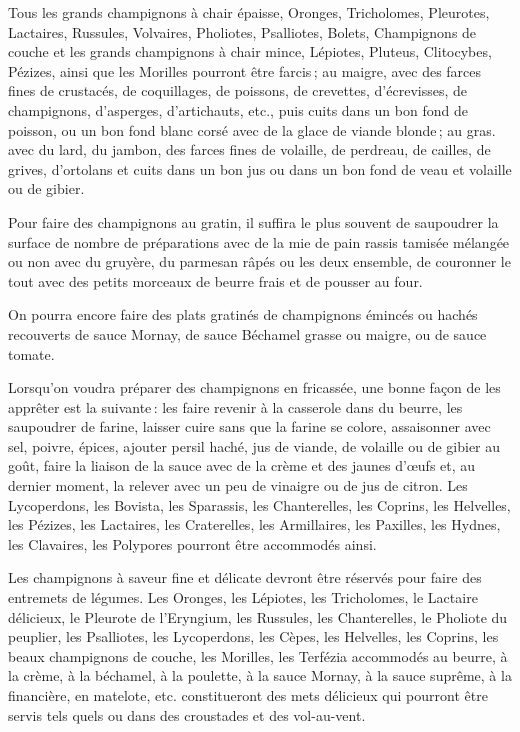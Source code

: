 \medskip

Tous les grands champignons à chair épaisse, Oronges, Tricholomes, Pleurotes,
Lactaires, Russules, Volvaires, Pholiotes, Psalliotes, Bolets, Champignons de
couche et les grands champignons à chair mince, Lépiotes, Pluteus, Clitocybes,
Pézizes, ainsi que les Morilles pourront être farcis ; au maigre, avec des
farces fines de crustacés, de coquillages, de poissons, de crevettes,
d’écrevisses, de champignons, d'asperges, d'artichauts, etc., puis cuits dans
un bon fond de poisson, ou un bon fond blanc corsé avec de la glace de viande
blonde ; au gras. avec du lard, du jambon, des farces fines de volaille, de
perdreau, de cailles, de grives, d'ortolans et cuits dans un bon jus ou dans un
bon fond de veau et volaille ou de gibier.

\medskip

Pour faire des champignons au gratin, il suffira le plus souvent de saupoudrer
la surface de nombre de préparations avec de la mie de pain rassis tamisée
mélangée ou non avec du gruyère, du parmesan râpés ou les deux ensemble, de
couronner le tout avec des petits morceaux de beurre frais et de pousser au
four.

On pourra encore faire des plats gratinés de champignons émincés ou hachés
recouverts de sauce Mornay, de sauce Béchamel grasse ou maigre, ou de sauce
tomate.

\medskip

Lorsqu'on voudra préparer des champignons en fricassée, une bonne façon de les
apprêter est la suivante : les faire revenir à la casserole dans du beurre, les
saupoudrer de farine, laisser cuire sans que la farine se colore, assaisonner
avec sel, poivre, épices, ajouter persil haché, jus de viande, de volaille ou
de gibier au goût, faire la liaison de la sauce avec de la crème et des jaunes
d'œufs et, au dernier moment, la relever avec un peu de vinaigre ou de jus de
citron. Les Lycoperdons, les Bovista, les Sparassis, les Chanterelles, les
Coprins, les Helvelles, les Pézizes, les Lactaires, les Craterelles, les
Armillaires, les Paxilles, les Hydnes, les Clavaires, les Polypores pourront
être accommodés ainsi.

\medskip

Les champignons à saveur fine et délicate devront être réservés pour faire des
entremets de légumes. Les Oronges, les Lépiotes, les Tricholomes, le Lactaire
délicieux, le Pleurote de l'Eryngium, les Russules, les Chanterelles, le
Pholiote du peuplier, les Psalliotes, les Lycoperdons, les Cèpes, les
Helvelles, les Coprins, les beaux champignons de couche, les Morilles, les
Terfézia accommodés au beurre, à la crème, à la béchamel, à la poulette, à la
sauce Mornay, à la sauce suprême, à la financière, en matelote, etc.
constitueront des mets délicieux qui pourront être servis tels quels ou dans
des croustades et des vol-au-vent.

